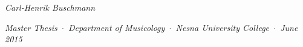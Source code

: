 


\begin{fullwidth}

\thispagestyle{empty}
\setlength{\parindent}{0pt}
\fontsize{24}{24}\selectfont\textit{Carl-Henrik Buschmann}

\vspace{1.75in}\fontsize{36}{54}\selectfont{The Musical Conventions \\ of Star Trek}

\vspace{0.5in}\fontsize{14}{14}

\vfill\fontsize{14}{14}\selectfont\textit{Master Thesis~\(\cdot\)~Department of Musicology~\(\cdot\)~Nesna University College~\(\cdot\)~June 2015}

\end{fullwidth}

